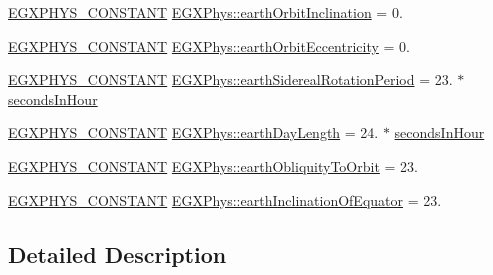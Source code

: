 \begin{DoxyCompactItemize}
\item 
\mbox{\hyperlink{group___e_g_x_phys-_constants-_macros_ga76980d288494ce1714c9ac68a95ba702}{E\+G\+X\+P\+H\+Y\+S\+\_\+\+C\+O\+N\+S\+T\+A\+NT}} \mbox{\hyperlink{group___e_g_x_phys-_constants-_astrophysics-_solar_system-_earth-_orbit_ga077f2f59673907855b0aa50123a32265}{E\+G\+X\+Phys\+::earth\+Orbit\+Inclination}} = 0.
\item 
\mbox{\hyperlink{group___e_g_x_phys-_constants-_macros_ga76980d288494ce1714c9ac68a95ba702}{E\+G\+X\+P\+H\+Y\+S\+\_\+\+C\+O\+N\+S\+T\+A\+NT}} \mbox{\hyperlink{group___e_g_x_phys-_constants-_astrophysics-_solar_system-_earth-_orbit_ga09b479dff54ecdc92386453498b86904}{E\+G\+X\+Phys\+::earth\+Orbit\+Eccentricity}} = 0.
\item 
\mbox{\hyperlink{group___e_g_x_phys-_constants-_macros_ga76980d288494ce1714c9ac68a95ba702}{E\+G\+X\+P\+H\+Y\+S\+\_\+\+C\+O\+N\+S\+T\+A\+NT}} \mbox{\hyperlink{group___e_g_x_phys-_constants-_astrophysics-_solar_system-_earth-_orbit_ga8ed3950e5beb733fd3ff9dad87879824}{E\+G\+X\+Phys\+::earth\+Sidereal\+Rotation\+Period}} = 23. $\ast$ \mbox{\hyperlink{namespace_e_g_x_phys_a7c3165cd93e36f1fb8e9fef80f117bef}{seconds\+In\+Hour}}
\item 
\mbox{\hyperlink{group___e_g_x_phys-_constants-_macros_ga76980d288494ce1714c9ac68a95ba702}{E\+G\+X\+P\+H\+Y\+S\+\_\+\+C\+O\+N\+S\+T\+A\+NT}} \mbox{\hyperlink{group___e_g_x_phys-_constants-_astrophysics-_solar_system-_earth-_orbit_ga224cdc14815d33b6a21b0f2988648cf9}{E\+G\+X\+Phys\+::earth\+Day\+Length}} = 24. $\ast$ \mbox{\hyperlink{namespace_e_g_x_phys_a7c3165cd93e36f1fb8e9fef80f117bef}{seconds\+In\+Hour}}
\item 
\mbox{\hyperlink{group___e_g_x_phys-_constants-_macros_ga76980d288494ce1714c9ac68a95ba702}{E\+G\+X\+P\+H\+Y\+S\+\_\+\+C\+O\+N\+S\+T\+A\+NT}} \mbox{\hyperlink{group___e_g_x_phys-_constants-_astrophysics-_solar_system-_earth-_orbit_gacb42020ec6e5cf996fa8a81f753efbb2}{E\+G\+X\+Phys\+::earth\+Obliquity\+To\+Orbit}} = 23.
\item 
\mbox{\hyperlink{group___e_g_x_phys-_constants-_macros_ga76980d288494ce1714c9ac68a95ba702}{E\+G\+X\+P\+H\+Y\+S\+\_\+\+C\+O\+N\+S\+T\+A\+NT}} \mbox{\hyperlink{group___e_g_x_phys-_constants-_astrophysics-_solar_system-_earth-_orbit_gad9b56019b866d3d6c7f030f37e2cca6b}{E\+G\+X\+Phys\+::earth\+Inclination\+Of\+Equator}} = 23.
\end{DoxyCompactItemize}


\subsection{Detailed Description}


